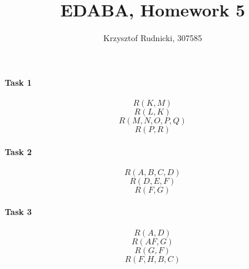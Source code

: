 \documentclass{report}
\title{EDABA, Homework 5}
\author{Krzysztof Rudnicki, 307585}
\begin{document}
\maketitle 

\paragraph{Task 1}
\[ R(K, M) \] 
\[ R(L, K) \] 
\[ R(M, N, O, P, Q) \] 
\[ R(P, R) \] 

\paragraph{Task 2}
\[ R(A, B, C, D) \] 
\[ R(D, E, F) \] 
\[ R(F, G) \] 


\paragraph{Task 3}
\[ R(A, D) \] 
\[ R(AF, G) \] 
\[ R(G, F) \] 
\[ R(F, H, B, C) \] 
\end{document}
